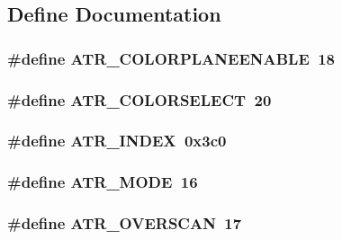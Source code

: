 \subsection{Define Documentation}
\hypertarget{ID__VL_8H_a3e9c2be045b4448ab7c5bc7f4fe9f6ca}{
\subsubsection[{ATR\_\-COLORPLANEENABLE}]{\setlength{\rightskip}{0pt plus 5cm}\#define ATR\_\-COLORPLANEENABLE~18}}
\label{ID__VL_8H_a3e9c2be045b4448ab7c5bc7f4fe9f6ca}
\hypertarget{ID__VL_8H_a41cec1553ce7481786cbf7fcef639e86}{
\subsubsection[{ATR\_\-COLORSELECT}]{\setlength{\rightskip}{0pt plus 5cm}\#define ATR\_\-COLORSELECT~20}}
\label{ID__VL_8H_a41cec1553ce7481786cbf7fcef639e86}
\hypertarget{ID__VL_8H_adb443be6b040d1e9746f308df8a135d0}{
\subsubsection[{ATR\_\-INDEX}]{\setlength{\rightskip}{0pt plus 5cm}\#define ATR\_\-INDEX~0x3c0}}
\label{ID__VL_8H_adb443be6b040d1e9746f308df8a135d0}
\hypertarget{ID__VL_8H_a6a0f6c169d9c1e60fd272375e94284a0}{
\subsubsection[{ATR\_\-MODE}]{\setlength{\rightskip}{0pt plus 5cm}\#define ATR\_\-MODE~16}}
\label{ID__VL_8H_a6a0f6c169d9c1e60fd272375e94284a0}
\hypertarget{ID__VL_8H_a87a453ad89faa9cc918ab6696cfee037}{
\subsubsection[{ATR\_\-OVERSCAN}]{\setlength{\rightskip}{0pt plus 5cm}\#define ATR\_\-OVERSCAN~17}}

